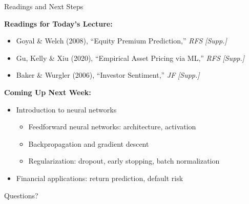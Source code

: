 \documentclass[10pt]{beamer}
\begin{document}
\begin{frame}{Readings and Next Steps}

  \textbf{Readings for Today's Lecture:}
  \begin{itemize}
    \item Goyal \& Welch (2008), ``Equity Premium Prediction,'' \textit{RFS} \hfill \textit{[Supp.]}
    \item Gu, Kelly \& Xiu (2020), ``Empirical Asset Pricing via ML,'' \textit{RFS} \hfill \textit{[Supp.]}
    \item Baker \& Wurgler (2006), ``Investor Sentiment,'' \textit{JF} \hfill \textit{[Supp.]}
  \end{itemize}

  \vspace{0.5em}
  \textbf{Coming Up Next Week:}
  \begin{itemize}
    \item Introduction to neural networks
    \begin{itemize}
      \item Feedforward neural networks: architecture, activation
      \item Backpropagation and gradient descent
      \item Regularization: dropout, early stopping, batch normalization
    \end{itemize}
    \item Financial applications: return prediction, default risk
  \end{itemize}
\end{frame}


\begin{frame}[plain]
  \centering
  \vfill
  {\Large Questions?}
  \vfill
\end{frame}
\end{document}
